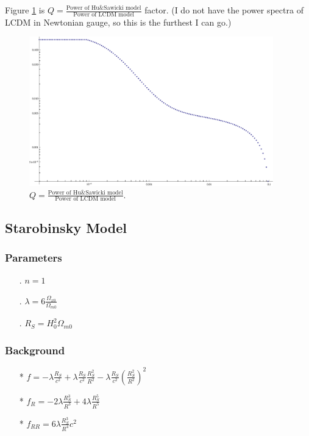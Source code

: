 \documentclass[12pt,a4paper]{article}
\begin{document}
Figure \ref{Fig-HSMod-QFac} is $Q=\frac{\text{Power of Hu\&Sawicki model}}{\text{Power of LCDM model}}$ factor. (I do not have the power spectra of LCDM in Newtonian gauge, so this is the furthest I can go.)

\begin{figure}[!htpb]
\centering
\includegraphics[width=300pt]{HSMod-QFac.eps}
\caption{$Q=\frac{\text{Power of Hu\&Sawicki model}}{\text{Power of LCDM model}}$.}\label{Fig-HSMod-QFac}
\end{figure}





\subsection{Starobinsky Model}

\subsubsection{Parameters}
\begin{itemize}
\item[.]
$n=1$
\item[.]
$\lambda=6\frac{\Omega_{x0}}{\Omega_{m0}}$
\item[.]
$R_S=H_0^2\Omega_{m0}$
\end{itemize}

\subsubsection{Background}

\begin{enumerate}
\item[*]
$f=-\lambda\frac{R_S}{c^2}+\lambda \frac{R_S}{c^2}\frac{R_S^2}{R^2}-\lambda \frac{R_S}{c^2}(\frac{R_S^2}{R^2})^2$
\item[*]
$f_R=-2\lambda \frac{R_S^3}{R^3}+4\lambda \frac{R_S^5}{R^5}$
\item[*]
$f_{RR}=6\lambda \frac{R_S^3}{R^4}c^2$
\end{enumerate}
\end{document}
